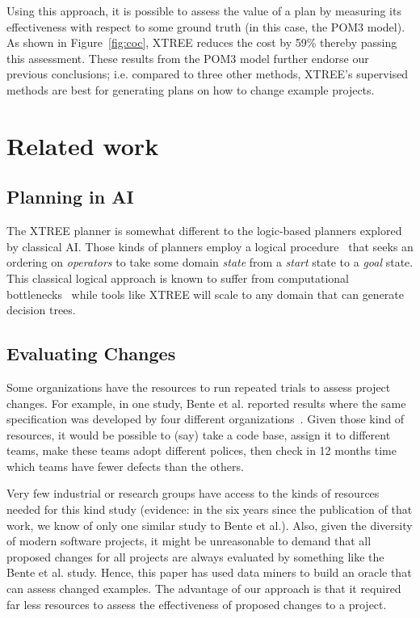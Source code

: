 \documentclass{sig-alternate}
\newcommand{\fig}[1]{Figure~\ref{fig:#1}}
\begin{document}
Using this approach, it is possible to assess the value of a plan by measuring its
effectiveness with respect to some ground truth (in this case, the POM3 model).
As shown in \fig{coc}, XTREE reduces the cost by 59\% thereby passing this assessment. These results from the POM3 model further endorse our previous conclusions; i.e. compared to three other methods,  XTREE's supervised methods are best for generating plans on how to change example projects.
 
 
\section{Related work}

\subsection{Planning in AI}

The XTREE planner is somewhat different to the logic-based planners explored by 
classical AI. 
Those kinds of planners employ a logical procedure~\cite{Fikes1971}
that seeks an ordering on {\em operators} to take some domain
{\em state} from a {\em start} state to a {\em  goal} state.
This classical logical approach is known to suffer from
computational bottlenecks~\cite{Bylander1994} while tools like XTREE will scale to any domain
that can generate decision trees.
  
\subsection{Evaluating Changes}

Some organizations have the resources to 
run repeated trials to assess  project changes.
For example, in one   study, Bente et al. reported results
where the same  specification was developed by four different organizations~\cite{Anda2009}. Given those kind of resources, it would be possible
to (say) take a code base, assign it to different teams, make these teams  adopt different polices,
then check in 12 months time
 which teams have fewer defects than the others.  
 

Very few industrial or research groups have access
to the kinds of resources needed for this kind study  (evidence: in the six years since the
publication of that work, we know of only one   similar study to Bente et al.). Also, given the
diversity of modern software projects, it might be unreasonable to demand that all
proposed changes for all projects are always evaluated by something like the Bente et al. study.
Hence, 
this paper has used data miners to build an oracle that can assess changed examples. The advantage
of our approach is that it required far less resources to assess the effectiveness of proposed
changes to a project.  
\end{document}
